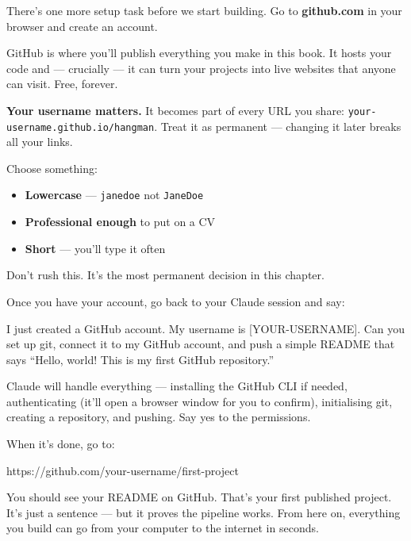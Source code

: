 \documentclass[11pt,a4paper]{article}
\begin{document}
There's one more setup task before we start building. Go to \textbf{github.com} in your browser and create an account.

GitHub is where you'll publish everything you make in this book. It hosts your code and --- crucially --- it can turn your projects into live websites that anyone can visit. Free, forever.

\textbf{Your username matters.} It becomes part of every URL you share: \texttt{your-username.github.io/hangman}. Treat it as permanent --- changing it later breaks all your links.

Choose something:

\begin{itemize}[leftmargin=1.5em]
  \item \textbf{Lowercase} --- \texttt{janedoe} not \texttt{JaneDoe}
  \item \textbf{Professional enough} to put on a CV
  \item \textbf{Short} --- you'll type it often
\end{itemize}

Don't rush this. It's the most permanent decision in this chapter.

Once you have your account, go back to your Claude session and say:

\begin{tcolorbox}[promptbox]
I just created a GitHub account. My username is [YOUR-USERNAME]. Can you set up git, connect it to my GitHub account, and push a simple README that says ``Hello, world! This is my first GitHub repository.''
\end{tcolorbox}

Claude will handle everything --- installing the GitHub CLI if needed, authenticating (it'll open a browser window for you to confirm), initialising git, creating a repository, and pushing. Say yes to the permissions.

When it's done, go to:

\begin{tcolorbox}[termbox]
https://github.com/your-username/first-project
\end{tcolorbox}

You should see your README on GitHub. That's your first published project. It's just a sentence --- but it proves the pipeline works. From here on, everything you build can go from your computer to the internet in seconds.

\newpage

\end{document}
